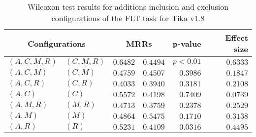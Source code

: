
\begin{table}
\begin{spacing}{1.2}
\centering
\caption{Wilcoxon test results for additions inclusion and exclusion configurations of the FLT task for Tika v1.8}
\label{table:versus-wilcox-tika-flt-additions}
\begin{tabular}{ll|rr|rr}
\toprule
      \multicolumn{2}{c|}{Configurations} &          \multicolumn{2}{c|}{MRRs} &       p-value & Effect size \\
\midrule
 $(A,C,M,R)$ &  $(C,M,R)$ & $0.6482$ & $0.4494$ & $p<0.01$ &    $0.6333$ \\
   $(A,C,M)$ &    $(C,M)$ & $0.4759$ & $0.4507$ & $0.3986$ &    $0.1847$ \\
   $(A,C,R)$ &    $(C,R)$ & $0.4033$ & $0.3940$ & $0.3181$ &    $0.2108$ \\
     $(A,C)$ &      $(C)$ & $0.5572$ & $0.4198$ & $0.7409$ &    $0.0739$ \\
   $(A,M,R)$ &    $(M,R)$ & $0.4713$ & $0.3759$ & $0.2378$ &    $0.2529$ \\
     $(A,M)$ &      $(M)$ & $0.4864$ & $0.5475$ & $0.1710$ &    $0.3138$ \\
     $(A,R)$ &      $(R)$ & $0.5231$ & $0.4109$ & $0.0316$ &    $0.4495$ \\
\bottomrule
\end{tabular}

\end{spacing}
\end{table}

